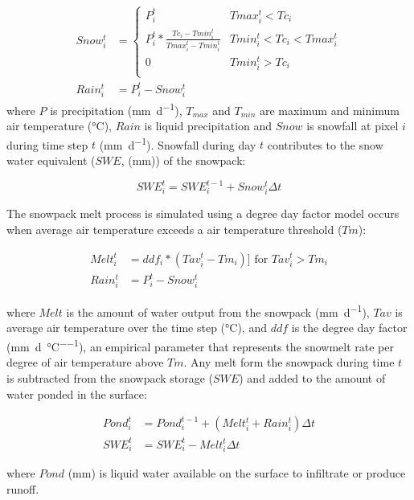\begin{align}
Snow_i^t &= \left\{
	\begin{array}{ll}
	P_i^t &  Tmax_i^t < Tc_i \\   
	P_i^t * \frac{Tc_i - Tmin_i^t}{Tmax_i^t - Tmin_i^t} & Tmin_i^t < Tc_i < Tmax_i^t \\
	0 &  Tmin_i^t > Tc_i \\
	\end{array}
\right.\\
Rain_i^t &= P_i^t - Snow_i^t 	 
\end{align} 
\noindent where $P$ is precipitation (\si{\milli\metre\per\day}), $T_{max}$ and $T_{min}$ are maximum and minimum air temperature (\si{\degreeCelsius}), $Rain$ is liquid precipitation and $Snow$ is snowfall at pixel $i$ during time step $t$ (\si{\milli\metre\per\day}). Snowfall during day $t$ contributes to the snow water equivalent ($SWE$, (\si{\milli\metre})) of the snowpack:

\begin{equation}
SWE_i^t = SWE_i^{t-1} + Snow_i^t \Delta t
\end{equation}

The snowpack melt process is simulated using a degree day factor model occurs when average air temperature exceeds a air temperature threshold ($Tm$):

\begin{align}
Melt_i^t &= ddf_i * (Tav_i^t - Tm_i)  ]\text{ for } Tav_i^t > Tm_i \\
Rain_i^t &= P_i^t - Snow_i^t 	 
\end{align} 

\noindent where $Melt$ is the amount of water output from the snowpack (\si{\milli\metre\per\day}), $Tav$ is average air temperature over the time step (\si{\degreeCelsius}), and $ddf$ is the degree day factor (\si{\milli\metre\per\day\per\degreeCelsius}), an empirical parameter that represents the snowmelt rate per degree of air temperature above $Tm$. Any melt form the snowpack during time $t$ is subtracted from the snowpack storage ($SWE$) and added to the amount of water ponded in the surface: 

\begin{align}
Pond_i^t &= Pond_i^{t-1} + (Melt_i^t + Rain_i^t)\Delta t \\
SWE_i^t &= SWE_i^t - Melt_i^t \Delta t 	 
\end{align} 

\noindent where $Pond$ (\si{\milli\metre}) is liquid water available on the surface to infiltrate or produce runoff. 

